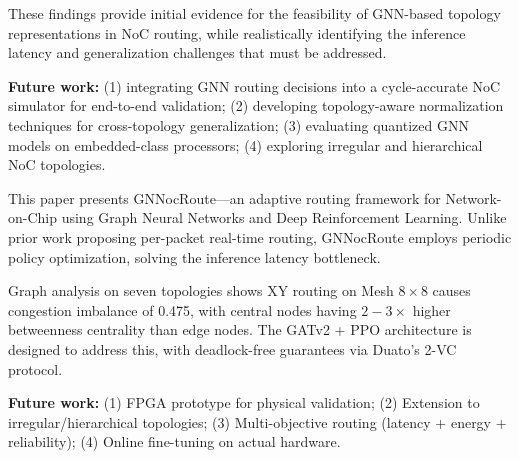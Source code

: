 \documentclass[conference]{IEEEtran}
\begin{document}
These findings provide initial evidence for the feasibility of GNN-based topology representations in NoC routing, while realistically identifying the inference latency and generalization challenges that must be addressed.

\textbf{Future work:} (1) integrating GNN routing decisions into a cycle-accurate NoC simulator for end-to-end validation; (2) developing topology-aware normalization techniques for cross-topology generalization; (3) evaluating quantized GNN models on embedded-class processors; (4) exploring irregular and hierarchical NoC topologies.

\label{sec:conclusion}

This paper presents GNNocRoute---an adaptive routing framework for Network-on-Chip using Graph Neural Networks and Deep Reinforcement Learning. Unlike prior work proposing per-packet real-time routing, GNNocRoute employs periodic policy optimization, solving the inference latency bottleneck.

Graph analysis on seven topologies shows XY routing on Mesh $8\times8$ causes congestion imbalance of 0.475, with central nodes having $2{-}3\times$ higher betweenness centrality than edge nodes. The GATv2 + PPO architecture is designed to address this, with deadlock-free guarantees via Duato's 2-VC protocol.

\textbf{Future work:} (1) FPGA prototype for physical validation; (2) Extension to irregular/hierarchical topologies; (3) Multi-objective routing (latency + energy + reliability); (4) Online fine-tuning on actual hardware.

\end{document}
